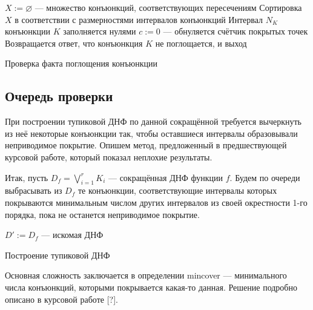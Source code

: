 \documentclass[12pt,a4paper,oneside,fleqn,leqno]{article}
\theoremstyle{definition}
\begin{document}
		\begin{algorithm}[H]
			\SetAlgoLined
			$X \mathbin{:=} \varnothing$ --- множество конъюнкций, соответствующих пересечениям\;
			Сортировка $X$ в соответствии с размерностями интервалов конъюнкций\;
			Интервал $N_K$ конъюнкции $K$ заполняется нулями\;
			$c \mathbin{:=} 0$ --- обнуляется счётчик покрытых точек\;
			Возвращается ответ, что конъюнкция $K$ не поглощается, и выход\;
			\caption{Проверка факта поглощения конъюнкции}
			\label{check_cover}
		\end{algorithm}
		\subsection{Очередь проверки}
			При построении тупиковой ДНФ по данной сокращённой требуется вычеркнуть из неё некоторые конъюнкции так, чтобы оставшиеся интервалы образовывали неприводимое покрытие. Опишем метод, предложенный в предшествующей курсовой работе, который показал неплохие результаты.\par
			Итак, пусть $D_f = \bigvee\limits_{i = 1}^r K_i$ --- сокращённая ДНФ функции $f$. Будем по очереди выбрасывать из $D_f$ те конъюнкции, соответствующие интервалы которых покрываются минимальным числом других интервалов из своей окрестности 1-го порядка, пока не останется неприводимое покрытие.\par
			\begin{algorithm}[H]
				\SetAlgoLined
				$D' \mathbin{:=} D_f$ --- искомая ДНФ\;	
			\caption{Построение тупиковой ДНФ}
			\label{get_irred}
		\end{algorithm}\par
		Основная сложность заключается в определении mincover --- минимального числа конъюнкций, которыми покрывается какая-то данная. Решение подробно описано в курсовой работе [?].
\end{document}

